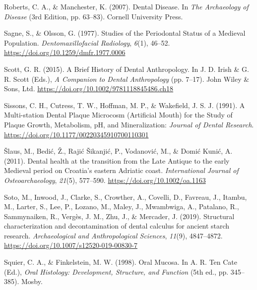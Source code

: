 \documentclass[
  letterpaper,
]{book}
\newlength{\cslhangindent}
\newlength{\cslentryspacingunit} %
\newenvironment{CSLReferences}[2] %
 {%
  \setlength{\parindent}{0pt}
  \ifodd #1
  \let\oldpar\par
  \def\par{\hangindent=\cslhangindent\oldpar}
  \fi
  \setlength{\parskip}{#2\cslentryspacingunit}
 }%
 {}
\begin{document}
\begin{CSLReferences}{1}{0}
\leavevmode{}%
Roberts, C. A., \& Manchester, K. (2007). Dental {Disease}. In \emph{The
{Archaeology} of {Disease}} (3rd Edition, pp. 63--83). {Cornell
University Press}.

\leavevmode{}%
Sagne, S., \& Olsson, G. (1977). Studies of the {Periodontal Status} of
a {Medieval Population}. \emph{Dentomaxillofacial Radiology},
\emph{6}(1), 46--52. \url{https://doi.org/10.1259/dmfr.1977.0006}

\leavevmode{}%
Scott, G. R. (2015). A {Brief History} of {Dental Anthropology}. In J.
D. Irish \& G. R. Scott (Eds.), \emph{A {Companion} to {Dental
Anthropology}} (pp. 7--17). {John Wiley \& Sons, Ltd}.
\url{https://doi.org/10.1002/9781118845486.ch18}

\leavevmode{}%
Sissons, C. H., Cutress, T. W., Hoffman, M. P., \& Wakefield, J. S. J.
(1991). A {Multi-station Dental Plaque Microcosm} ({Artificial Mouth})
for the {Study} of {Plaque Growth}, {Metabolism}, {pH}, and
{Mineralization}: \emph{Journal of Dental Research}.
\url{https://doi.org/10.1177/00220345910700110301}

\leavevmode{}%
Šlaus, M., Bedić, Ž., Rajić Šikanjić, P., Vodanović, M., \& Domić Kunić,
A. (2011). Dental health at the transition from the {Late Antique} to
the early {Medieval} period on {Croatia}'s eastern {Adriatic} coast.
\emph{International Journal of Osteoarchaeology}, \emph{21}(5),
577--590. \url{https://doi.org/10.1002/oa.1163}

\leavevmode{}%
Soto, M., Inwood, J., Clarke, S., Crowther, A., Covelli, D., Favreau,
J., Itambu, M., Larter, S., Lee, P., Lozano, M., Maley, J., Mwambwiga,
A., Patalano, R., Sammynaiken, R., Vergès, J. M., Zhu, J., \& Mercader,
J. (2019). Structural characterization and decontamination of dental
calculus for ancient starch research. \emph{Archaeological and
Anthropological Sciences}, \emph{11}(9), 4847--4872.
\url{https://doi.org/10.1007/s12520-019-00830-7}

\leavevmode{}%
Squier, C. A., \& Finkelstein, M. W. (1998). Oral {Mucosa}. In A. R. Ten
Cate (Ed.), \emph{Oral {Histology}: {Development}, {Structure}, and
{Function}} (5th ed., pp. 345--385). {Mosby}.


\end{CSLReferences}
\end{document}
